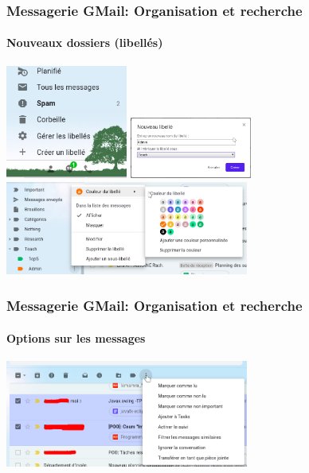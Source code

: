 \documentclass{beamer}
\begin{document}
\begin{frame}
\frametitle{Messagerie GMail: Organisation et recherche}
\framesubtitle{Nouveaux dossiers (libellés)}
\includegraphics[width=4cm]{..//img/Bweb02-ri-gmail/gmail-label1.png}
\includegraphics[width=4cm]{..//img/Bweb02-ri-gmail/gmail-label2.png}
\includegraphics[width=8cm]{..//img/Bweb02-ri-gmail/gmail-label3.png}
\end{frame}

\begin{frame}
\frametitle{Messagerie GMail: Organisation et recherche}
\framesubtitle{Options sur les messages}

\includegraphics[width=8cm]{..//img/Bweb02-ri-gmail/gmail-options.png}

\end{frame}
\end{document}
